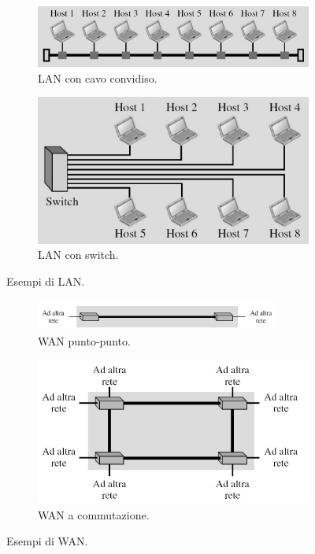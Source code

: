 \documentclass[11pt, italian, openany]{book}
\begin{document}
\begin{sloppypar}
\begin{figure}[h!]
	\begin{subfigure}[t]{0.49 \linewidth} \centering
		\includegraphics[scale=0.35]{images/lan-obsoleta.png}
		\caption{LAN con cavo convidiso.}
	\end{subfigure}
	\begin{subfigure}[t]{0.49 \linewidth} \centering
		\includegraphics[scale=0.4]{images/lan-moderna.png}
		\caption{LAN con switch.}
	\end{subfigure}
	\caption{Esempi di LAN.}
	\label{fig:LAN}
\end{figure}

\begin{figure}[h!]
	\begin{subfigure}[t]{0.49 \linewidth} \centering
		\includegraphics[width=80mm,height=10mm]{images/wan-puntopunto.png}
		\caption{WAN punto-punto.}
	\end{subfigure}
	\begin{subfigure}[t]{0.49 \linewidth} \centering
		\includegraphics[scale=0.35]{images/wan-commutazione.png}
		\caption{WAN a commutazione.}
	\end{subfigure}
	\caption{Esempi di WAN.}
	\label{fig:WAN}
\end{figure}


\end{sloppypar}
\end{document}

